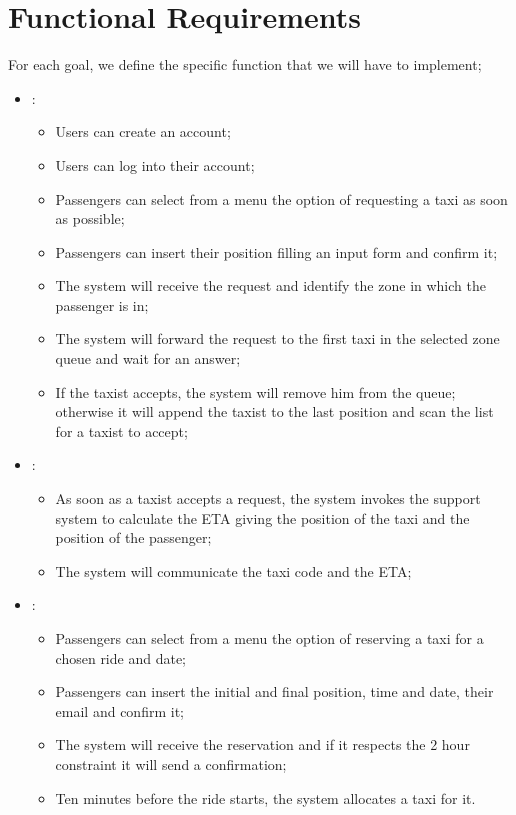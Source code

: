 \section { Functional Requirements}
 
For each goal, we define the specific function that we will have to implement;\\
\begin {itemize}
\item [G1]:
	\begin{itemize}
	\item Users can create an account;
	\item Users can log into their account;
	\item Passengers can select from a menu the option of requesting a taxi as soon as possible; 
	\item Passengers can insert their position filling an input form and confirm it;
	\item The system will receive the request and identify the zone in which the passenger is in;
	\item The system will forward the request to the first taxi in the selected zone queue and wait for an answer;
	\item If the taxist accepts, the system will remove him from the queue; otherwise it will append the taxist to the last position and
scan the list for a taxist to accept;
	\end{itemize}
\item [G2]:
	\begin{itemize}
	\item As soon as a taxist accepts a request, the system invokes the support system to calculate the ETA 
	giving the position of the taxi and the position of the passenger;
	\item The system will communicate the taxi code and the ETA;
	\end{itemize}
\item [G3]:
	\begin{itemize}
	\item Passengers can select from a menu the option of reserving a taxi for a chosen ride and date; 
	\item Passengers can insert the initial and final position, time and date, their email and confirm it;
	\item The system will receive the reservation and if it respects the 2 hour constraint it will send a confirmation;
	\item Ten minutes before the ride starts, the system allocates a taxi for it.

\end{itemize}
\end{itemize}
